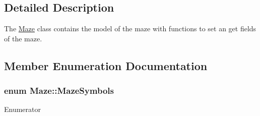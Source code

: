 \subsection{Detailed Description}
The \hyperlink{class_maze}{Maze} class contains the model of the maze with functions to set an get fields of the maze. 

\subsection{Member Enumeration Documentation}
\hypertarget{class_maze_a7a19b706242876f2c597033b3374e7fa}{
\subsubsection[{Maze\-Symbols}]{\setlength{\rightskip}{0pt plus 5cm}enum {\bf Maze\-::\-Maze\-Symbols}}}\label{class_maze_a7a19b706242876f2c597033b3374e7fa}
\begin{Desc}
\item[Enumerator]\par
\begin{description}
\item[{\em 
\hypertarget{class_maze_a7a19b706242876f2c597033b3374e7faa4b3509571b07cde9b535f8358157d676}{Wall}\label{class_maze_a7a19b706242876f2c597033b3374e7faa4b3509571b07cde9b535f8358157d676}
}]\item[{\em 
\hypertarget{class_maze_a7a19b706242876f2c597033b3374e7faac7cbc8392fac9738ef3dac458865d3eb}{Way}\label{class_maze_a7a19b706242876f2c597033b3374e7faac7cbc8392fac9738ef3dac458865d3eb}
}]\item[{\em 
\hypertarget{class_maze_a7a19b706242876f2c597033b3374e7faaf68b987d7cff7378d76e7b4159aeea6d}{Start}\label{class_maze_a7a19b706242876f2c597033b3374e7faaf68b987d7cff7378d76e7b4159aeea6d}
}]\item[{\em 
\hypertarget{class_maze_a7a19b706242876f2c597033b3374e7faa752d570bd64e08ce1c7f358dd3cc6969}{End}\label{class_maze_a7a19b706242876f2c597033b3374e7faa752d570bd64e08ce1c7f358dd3cc6969}
}]\item[{\em 
\hypertarget{class_maze_a7a19b706242876f2c597033b3374e7faaa87a698c7829b0c1f1b89cc93a44f2bc}{Result}\label{class_maze_a7a19b706242876f2c597033b3374e7faaa87a698c7829b0c1f1b89cc93a44f2bc}
}]\end{description}
\end{Desc}


